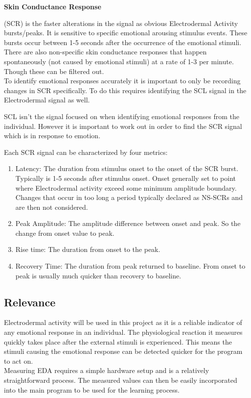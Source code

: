 \documentclass{report}
\begin{document}
\hypertarget{txt:scr}{\textbf{Skin Conductance Response}} (SCR) is the faster alterations in the signal as obvious Electrodermal Activity bursts/peaks. It is sensitive to specific emotional arousing stimulus 
events. These bursts occur between 1-5 seconds after the occurrence of the emotional stimuli. There are also non-specific skin conductance responses that happen spontaneously 
(not caused by emotional stimuli) at a rate of 1-3 per minute. Though these can be filtered out.\\
To identify emotional responses accurately it is important to only be recording changes in SCR specifically. To do this requires identifying the SCL signal in the Electrodermal signal as well. 

SCL isn't the signal focused on when identifying emotional responses from the individual. However it is important to work out in order to find the SCR signal which is in response to emotion.

Each SCR signal can be characterized by four metrics:
\begin{enumerate}
	\item Latency: The duration from stimulus onset to the onset of the SCR burst. Typically is 1-5 seconds after stimulus onset. 
	Onset generally set to point where Electrodermal activity exceed some minimum amplitude boundary. Changes that occur in too long a period typically declared 
	as NS-SCRs and are then not considered.
	\item Peak Amplitude: The amplitude difference between onset and peak. So the change from onset value to peak. 
	\item Rise time: The duration from onset to the peak.
	\item Recovery Time: The duration from peak returned to baseline. From onset to peak is usually much quicker than recovery to baseline.
\end{enumerate}

\subsection{Relevance}

Electrodermal activity will be used in this project as it is a reliable indicator of any emotional response in an individual. The physiological reaction it measures quickly
takes place after the external stimuli is experienced. This means the stimuli causing the emotional response can be detected quicker for the program to act on.\\
Measuring EDA requires a simple hardware setup and is a relatively straightforward process.  The measured values can then be easily incorporated into the main program
to be used for the learning process.
\end{document}
